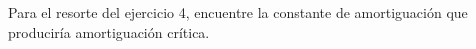 \item Para el resorte del ejercicio 4, encuentre la constante de amortiguación que produciría amortiguación crítica.

